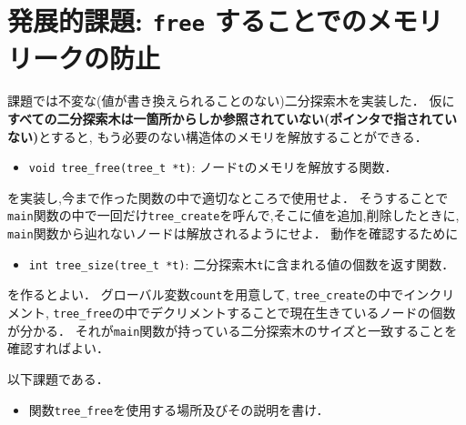 \documentclass[a4paper,twoside,onecolumn,openany,article]{memoir}
\theoremstyle{remark}
\begin{document}
\section{発展的課題: \texttt{free} することでのメモリリークの防止}
課題では不変な(値が書き換えられることのない)二分探索木を実装した．
仮に\textbf{すべての二分探索木は一箇所からしか参照されていない(ポインタで指されていない)}とすると,
もう必要のない構造体のメモリを解放することができる．
\begin{itemize}
\item \texttt{void tree\_free(tree\_t *t)}: ノード\texttt{t}のメモリを解放する関数．
\end{itemize}
を実装し,今まで作った関数の中で適切なところで使用せよ．
そうすることで\texttt{main}関数の中で一回だけ\texttt{tree\_create}を呼んで,そこに値を追加,削除したときに,
\texttt{main}関数から辿れないノードは解放されるようにせよ．
動作を確認するために
\begin{itemize}
\item \texttt{int tree\_size(tree\_t *t)}: 二分探索木\texttt{t}に含まれる値の個数を返す関数．
\end{itemize}
を作るとよい．
グローバル変数\texttt{count}を用意して,
\texttt{tree\_create}の中でインクリメント,
\texttt{tree\_free}の中でデクリメントすることで現在生きているノードの個数が分かる．
それが\texttt{main}関数が持っている二分探索木のサイズと一致することを確認すればよい．

以下課題である．
\begin{itemize}
\item 関数\texttt{tree\_free}を使用する場所及びその説明を書け．
\end{itemize}
\end{document}

